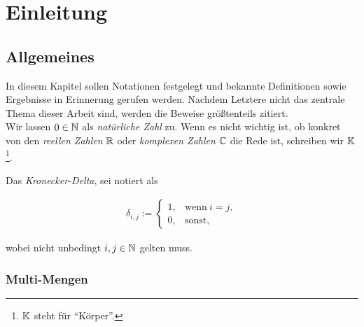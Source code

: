\chapter{Einleitung} \label{chap:introduction}

    \section{Allgemeines}

        In diesem Kapitel sollen Notationen festgelegt und bekannte Definitionen sowie Ergebnisse in Erinnerung gerufen werden.
        Nachdem Letztere nicht das zentrale Thema dieser Arbeit sind, werden die Beweise größtenteils zitiert. \\

        Wir lassen $0 \in \mathbb N$ als \textit{natürliche Zahl} zu.
        Wenn es nicht wichtig ist, ob konkret von den \textit{reellen Zahlen} $\mathbb R$ oder \textit{komplexen Zahlen} $\mathbb C$ die Rede ist, schreiben wir $\mathbb K$\footnote{$\mathbb K$ steht für \enquote{Körper}.}.

        Das \textit{Kronecker-Delta}, sei notiert als

        \begin{align*}
            \delta_{i, j}
            :=
            \begin{cases}
                1, & \text{wenn} ~ i = j, \\
                0, & \text{sonst},
            \end{cases}
        \end{align*}

        wobei nicht unbedingt $i, j \in \mathbb N$ gelten muss.

        \subsection{Multi-Mengen}

